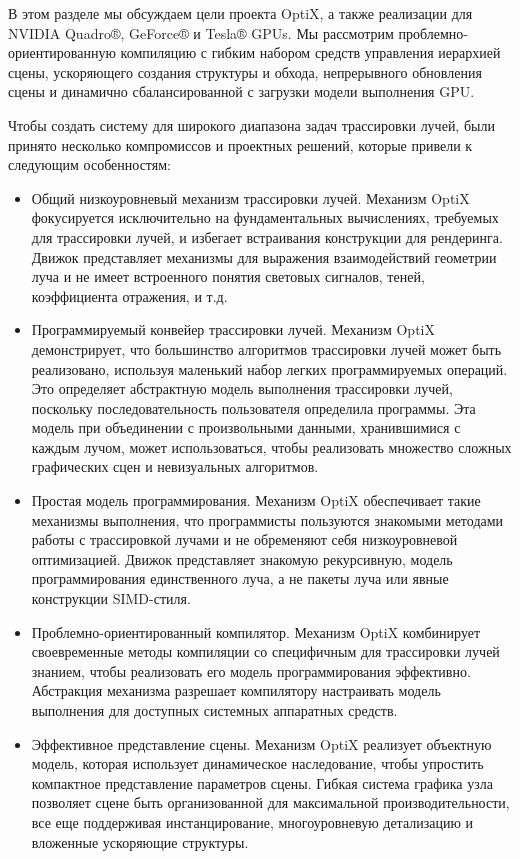 В этом разделе мы обсуждаем цели проекта OptiX, а также реализации для NVIDIA Quadro®, GeForce® и Tesla® GPUs. 
Мы рассмотрим проблемно-ориентированную компиляцию с гибким набором средств управления иерархией сцены, ускоряющего создания структуры и обхода, непрерывного обновления сцены и динамично сбалансированной с загрузки модели выполнения GPU. 

Чтобы создать систему для широкого диапазона задач трассировки лучей, были принято несколько компромиссов и проектных решений, которые привели к следующим особенностям:
\begin{itemize}
 \item Общий низкоуровневый механизм трассировки лучей. 
 Механизм OptiX фокусируется исключительно на фундаментальных вычислениях, требуемых для трассировки лучей, и избегает встраивания конструкции для рендеринга. 
 Движок представляет механизмы для выражения взаимодействий геометрии луча и не имеет встроенного понятия световых сигналов, теней, коэффициента отражения, и т.д.

\item Программируемый конвейер трассировки лучей. 
Механизм OptiX демонстрирует, что большинство алгоритмов трассировки лучей может быть реализовано, используя маленький набор легких программируемых операций. 
Это определяет абстрактную модель выполнения трассировки лучей, поскольку последовательность пользователя определила программы. 
Эта модель при объединении с произвольными данными, хранившимися с каждым лучом, может использоваться, чтобы реализовать множество сложных графических сцен и невизуальных алгоритмов.

\item Простая модель программирования. 
Механизм OptiX обеспечивает такие механизмы выполнения, что программисты пользуются знакомыми методами работы с трассировкой лучами и  не обременяют себя низкоуровневой оптимизацией. 
Движок представляет знакомую рекурсивную, модель программирования единственного луча, а не пакеты луча или явные конструкции SIMD-стиля. 

\item Проблемно-ориентированный компилятор. 
Механизм OptiX комбинирует своевременные методы компиляции со специфичным для трассировки лучей знанием, чтобы реализовать его модель программирования эффективно. 
Абстракция механизма разрешает компилятору настраивать модель выполнения для доступных системных аппаратных средств.

\item Эффективное представление сцены. 
Механизм OptiX реализует объектную модель, которая использует динамическое наследование, чтобы упростить компактное представление параметров сцены. 
Гибкая система графика узла позволяет сцене быть организованной для максимальной производительности, все еще поддерживая инстанцирование, многоуровневую детализацию и вложенные ускоряющие структуры.

\end{itemize}


